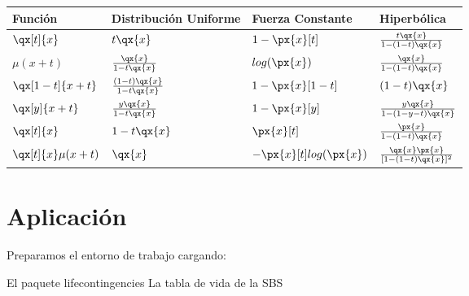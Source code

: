 \documentclass[12pt]{report}
\begin{document}
\begin{tabular}{ |p{2cm}|p{4cm}|p{4cm}|p{3cm}|  }
  \hline
  \centering Funci\'on & 
   Distribuci\'on Uniforme & 
  Fuerza Constante & 
  Hiperb\'olica \\
  \hline %
    \centering $\qx[t]{x}$ &
    \centering $t\qx{x}$ &
    \centering $1-\px{x}[t]$ &
    $\frac{t\qx{x}}{1-(1-t)\qx{x}}$ \\
  
  \hline %
    \centering $\mu(x+t)$  & 
    \centering $\frac{\qx{x}}{1-t\qx{x}}$ &
    \centering $log(\px{x})$ &
    $\frac{\qx{x}}{1-(1-t)\qx{x}}$ \\
  
  \hline %
    \centering $\qx[1-t]{x+t}$ & 
    \centering $\frac{(1-t)\qx{x}}{1-t\qx{x}}$ & 
    \centering $1-\px{x}[1-t]$ &  
    $(1-t)\qx{x}$ \\
  
  \hline %
    \centering $\qx[y]{x+t}$ &
    \centering $\frac{y\qx{x}}{1-t\qx{x}}$ & 
    \centering $1-\px{x}[y]$ &  
    $\frac{y\qx{x}}{1-(1-y-t)\qx{x}}$ \\
  
  \hline %
    \centering $\qx[t]{x}$ & 
    \centering $1-t\qx{x}$ & 
    \centering $\px{x}[t]$ &  
    $\frac{\px{x}}{1-(1-t)\qx{x}}$ \\
    
  \hline %
    \centering $\qx[t]{x}\mu(x+t)$ & 
    \centering $\qx{x}$ & 
    \centering $-\px{x}[t]log(\px{x})$ &  
    $\frac{\qx{x}\px{x}}{[1-(1-t)\qx{x}]^2}$ \\
  \hline
\end{tabular}



\chapter{Aplicaci\'on}


Preparamos el entorno de trabajo cargando:

El paquete lifecontingencies
La tabla de vida de la SBS
\end{document}
